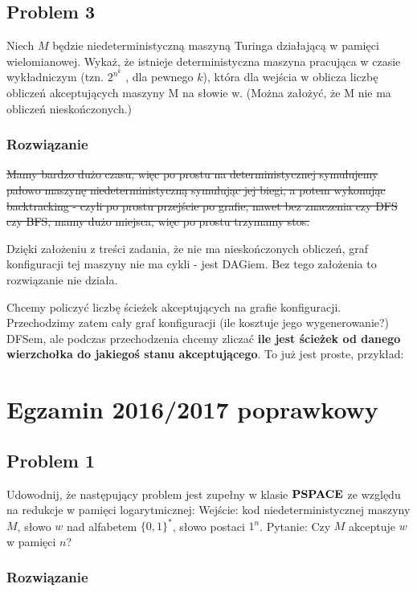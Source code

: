\subsection{Problem 3}

Niech $M$ będzie niedeterministyczną maszyną Turinga działającą w pamięci wielomianowej. Wykaż, że istnieje deterministyczna maszyna pracująca w czasie wykładniczym (tzn. $2^{n^k}$ , dla pewnego $k$), która dla wejścia w oblicza liczbę obliczeń akceptujących maszyny M na słowie w. (Można założyć, że M nie ma obliczeń nieskończonych.)

\subsubsection*{Rozwiązanie}

\sout{Mamy bardzo dużo czasu, więc po prostu na deterministycznej symulujemy pałowo maszynę niedeterministyczną symulując jej biegi, a potem wykonując backtracking - czyli po prostu przejście po grafie, nawet bez znaczenia czy DFS czy BFS, mamy dużo miejsca, więc po prostu trzymamy stos.}

Dzięki założeniu z treści zadania, że nie ma nieskończonych obliczeń, graf konfiguracji tej maszyny nie ma cykli - jest DAGiem. Bez tego założenia to rozwiązanie nie działa.

Chcemy policzyć liczbę ścieżek akceptujących na grafie konfiguracji. Przechodzimy zatem cały graf konfiguracji (ile kosztuje jego wygenerowanie?) DFSem, ale podczas przechodzenia chcemy zliczać \textbf{ile jest ścieżek od danego wierzchołka do jakiegoś stanu akceptującego}. To już jest proste, przykład:





\section{Egzamin 2016/2017 poprawkowy}
\subsection{Problem 1}
Udowodnij, że następujący problem jest zupełny w klasie $\textbf{PSPACE}$ ze względu na redukcje w pamięci logarytmicznej:
Wejście: kod niedeterministycznej maszyny $M$, słowo $w$ nad alfabetem $\{0,1\}^*$, słowo postaci $1^n$. Pytanie: Czy $M$ akceptuje $w$ w pamięci $n$?

\subsubsection*{Rozwiązanie}


